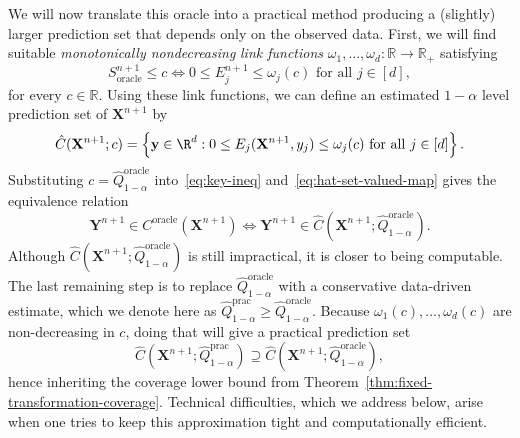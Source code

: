 We will now translate this oracle into a practical method producing a (slightly) larger prediction set that depends only on the observed data. 
{\color{blue}
First, we will find suitable {\em monotonically nondecreasing} {\em link functions} $\omega_1, \ldots, \omega_d : \mathbb{R} \to \mathbb{R}_+$ satisfying 
\begin{equation}
S_{\mathrm{oracle}}^{n+1} \le c 
\iff 
0\leq {E}^{n+1}_j \le \omega_j(c)\text{ for all } j \in [d],
\label{eq:key-ineq}
\end{equation}
for every $c \in \mathbb{R}$. Using these link functions, we can define an estimated $1-\alpha$ level prediction set of $\mathbf{X}^{n+1}$ by
\begin{equation}
\hat{C}(\mathbf{X}^{n+1}; c) = \left\{\mathbf y \in \R^d: 0\leq E_j(\mathbf{X}^{n+1}, y_j) \leq \omega_j(c)\text{ for all } j \in [d]\right\}.  
\label{eq:hat-set-valued-map}
\end{equation}
Substituting $c = \hat{Q}^{\mathrm{oracle}}_{1-\alpha}$ into~\eqref{eq:key-ineq} and~\eqref{eq:hat-set-valued-map} gives the equivalence relation
\begin{equation} \label{eq:oracle-dual}
\mathbf{Y}^{n+1} \in {C}^{\mathrm{oracle}}(\mathbf{X}^{n+1}) \iff \mathbf{Y}^{n+1} \in \hat{C}(\mathbf{X}^{n+1}; \hat{Q}^{\mathrm{oracle}}_{1-\alpha}).
\end{equation}
Although $\hat{C}(\mathbf{X}^{n+1}; \hat{Q}^{\mathrm{oracle}}_{1-\alpha})$ is still impractical, it is closer to being computable.
The last remaining step is to replace $\hat{Q}^{\mathrm{oracle}}_{1-\alpha}$ with a conservative data-driven estimate, which we denote here as $\hat{Q}^\mathrm{prac}_{1-\alpha} \geq \hat{Q}^{\mathrm{oracle}}_{1-\alpha}$. Because $\omega_1(c),\ldots,\omega_d(c)$ are non-decreasing in $c$, doing that will give a practical prediction set
\begin{equation} \label{eq:trans-oracle-upper-bound}
\hat{C}(\mathbf{X}^{n+1}; \hat{Q}^\mathrm{prac}_{1-\alpha})
\supseteq \hat{C}(\mathbf{X}^{n+1}; \hat{Q}^{\mathrm{oracle}}_{1-\alpha}),
\end{equation}
hence inheriting the coverage lower bound from Theorem~\ref{thm:fixed-transformation-coverage}.}
Technical difficulties, which we address below, arise when one tries to keep this approximation tight and computationally efficient.


